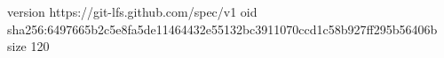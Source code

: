 version https://git-lfs.github.com/spec/v1
oid sha256:6497665b2c5e8fa5de11464432e55132bc3911070ccd1c58b927ff295b56406b
size 120
